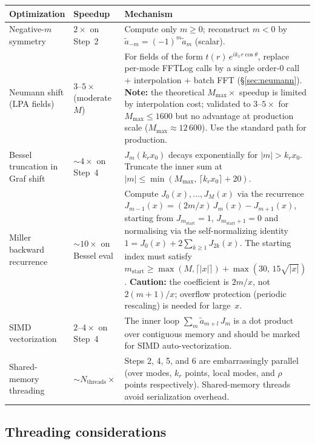\documentclass[11pt,a4paper]{article}
\begin{document}
\begin{center}
\begin{tabular}{@{}l l p{7cm}@{}}
\toprule
\textbf{Optimization} & \textbf{Speedup} & \textbf{Mechanism} \\
\midrule
Negative-$m$ symmetry
  & $2\times$ on Step~2
  & Compute only $m \ge 0$; reconstruct $m < 0$ by
    $\tilde a_{-m} = (-1)^m\tilde a_m$ (scalar). \\[6pt]
Neumann shift (LPA fields)
  & $3$--$5\times$ (moderate $M$)
  & For fields of the form $t(r)\,e^{ik_x r\cos\theta}$, replace
    per-mode FFTLog calls by a single order-0 call + interpolation +
    batch FFT (\S\ref{sec:neumann}).  \textbf{Note:} the theoretical
    $M_{\max}\times$ speedup is limited by interpolation cost; validated
    to $3$--$5\times$ for $M_{\max} \le 1600$ but no advantage at
    production scale ($M_{\max} \approx 12\,600$).  Use the standard
    path for production. \\[6pt]
Bessel truncation in Graf shift
  & ${\sim}4\times$ on Step~4
  & $J_m(k_r x_0)$ decays exponentially for $|m| > k_r x_0$.
    Truncate the inner sum at
    $|m| \le \min(M_{\max},\,\lceil k_r x_0\rceil + 20)$. \\[6pt]
Miller backward recurrence
  & ${\sim}10\times$ on Bessel eval
  & Compute $J_0(x), \ldots, J_{M}(x)$ via the recurrence
    $J_{m-1}(x) = (2m/x)\,J_m(x) - J_{m+1}(x)$,
    starting from $J_{m_{\mathrm{start}}} = 1$, $J_{m_{\mathrm{start}}+1} = 0$
    and normalising via the self-normalizing identity
    $1 = J_0(x) + 2\sum_{k\ge 1} J_{2k}(x)$.
    The starting index must satisfy
    $m_{\mathrm{start}} \ge \max(M, \lceil|x|\rceil) + \max(30,\, 15\sqrt{|x|})$.
    \textbf{Caution:} the coefficient is $2m/x$, not $2(m{+}1)/x$;
    overflow protection (periodic rescaling) is needed for large~$x$. \\[6pt]
SIMD vectorization
  & $2$--$4\times$ on Step~4
  & The inner loop $\sum_m \tilde a_{m+l}\,J_m$ is a dot product
    over contiguous memory and should be marked for SIMD
    auto-vectorization. \\[6pt]
Shared-memory threading
  & ${\sim}N_{\mathrm{threads}}\times$
  & Steps 2, 4, 5, and 6 are embarrassingly parallel (over modes,
    $k_r$ points, local modes, and $\rho$ points respectively).
    Shared-memory threads avoid serialization overhead. \\
\bottomrule
\end{tabular}
\end{center}

\subsection{Threading considerations}
\end{document}
